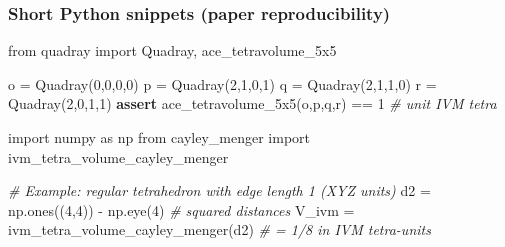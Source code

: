 \documentclass[
]{article}
\newenvironment{Shaded}{}{}
\newcommand{\CommentTok}[1]{\textcolor[rgb]{0.38,0.63,0.69}{\textit{#1}}}
\newcommand{\ControlFlowTok}[1]{\textcolor[rgb]{0.00,0.44,0.13}{\textbf{#1}}}
\newcommand{\DecValTok}[1]{\textcolor[rgb]{0.25,0.63,0.44}{#1}}
\newcommand{\ImportTok}[1]{#1}
\newcommand{\NormalTok}[1]{#1}
\newcommand{\OperatorTok}[1]{\textcolor[rgb]{0.40,0.40,0.40}{#1}}
\begin{document}
\hypertarget{short-python-snippets-paper-reproducibility}{%
\subsubsection{Short Python snippets (paper
reproducibility)}\label{short-python-snippets-paper-reproducibility}}

\begin{Shaded}
\begin{Highlighting}[]
\ImportTok{from}\NormalTok{ quadray }\ImportTok{import}\NormalTok{ Quadray, ace\_tetravolume\_5x5}

\NormalTok{o }\OperatorTok{=}\NormalTok{ Quadray(}\DecValTok{0}\NormalTok{,}\DecValTok{0}\NormalTok{,}\DecValTok{0}\NormalTok{,}\DecValTok{0}\NormalTok{)}
\NormalTok{p }\OperatorTok{=}\NormalTok{ Quadray(}\DecValTok{2}\NormalTok{,}\DecValTok{1}\NormalTok{,}\DecValTok{0}\NormalTok{,}\DecValTok{1}\NormalTok{)}
\NormalTok{q }\OperatorTok{=}\NormalTok{ Quadray(}\DecValTok{2}\NormalTok{,}\DecValTok{1}\NormalTok{,}\DecValTok{1}\NormalTok{,}\DecValTok{0}\NormalTok{)}
\NormalTok{r }\OperatorTok{=}\NormalTok{ Quadray(}\DecValTok{2}\NormalTok{,}\DecValTok{0}\NormalTok{,}\DecValTok{1}\NormalTok{,}\DecValTok{1}\NormalTok{)}
\ControlFlowTok{assert}\NormalTok{ ace\_tetravolume\_5x5(o,p,q,r) }\OperatorTok{==} \DecValTok{1}  \CommentTok{\# unit IVM tetra}
\end{Highlighting}
\end{Shaded}

\begin{Shaded}
\begin{Highlighting}[]
\ImportTok{import}\NormalTok{ numpy }\ImportTok{as}\NormalTok{ np}
\ImportTok{from}\NormalTok{ cayley\_menger }\ImportTok{import}\NormalTok{ ivm\_tetra\_volume\_cayley\_menger}

\CommentTok{\# Example: regular tetrahedron with edge length 1 (XYZ units)}
\NormalTok{d2 }\OperatorTok{=}\NormalTok{ np.ones((}\DecValTok{4}\NormalTok{,}\DecValTok{4}\NormalTok{)) }\OperatorTok{{-}}\NormalTok{ np.eye(}\DecValTok{4}\NormalTok{)  }\CommentTok{\# squared distances}
\NormalTok{V\_ivm }\OperatorTok{=}\NormalTok{ ivm\_tetra\_volume\_cayley\_menger(d2)   }\CommentTok{\# = 1/8 in IVM tetra{-}units}
\end{Highlighting}
\end{Shaded}
\end{document}
